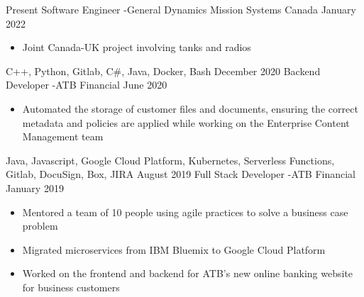 
\begin{experiences}
  \experience
    {Present}   {Software Engineer -}{General Dynamics Mission Systems Canada}{}
    {January 2022} {
                      \begin{itemize}
                        \item Joint Canada-UK project involving tanks and radios
                      \end{itemize}
                    }
                    {
                      C++,
                      Python,
                      Gitlab,
                      C\#,
                      Java,
                      Docker,
                      Bash
                    }
  \emptySeparator
  \experience
    {December 2020}   {Backend Developer -}{ATB Financial}{}
    {June 2020} {
                      \begin{itemize}
                        \item Automated the storage of customer files and
                          documents, ensuring the correct metadata and policies
                          are applied while working on the Enterprise Content
                          Management team
                      \end{itemize}
                    }
                    {
                        Java,
                        Javascript,
                        Google Cloud Platform,
                        Kubernetes,
                        Serverless Functions,
                        Gitlab,
                        DocuSign,
                        Box,
                        JIRA
                    }
  \emptySeparator
  \experience
    {August 2019}   {Full Stack Developer -}{ATB Financial}{}
    {January 2019} {
                      \begin{itemize}
                        \item Mentored a team of 10 people using agile
                          practices to solve a business case problem
                        \item Migrated microservices from IBM Bluemix to Google
                          Cloud Platform
                        \item Worked on the frontend and backend
                          for ATB's new online banking website for business
                          customers
                      \end{itemize}
}
\end{experiences}
